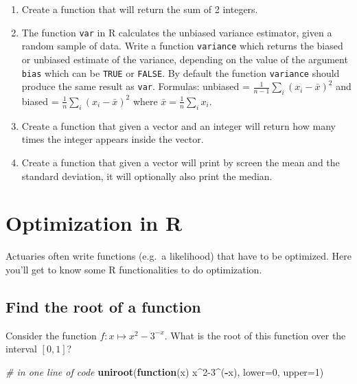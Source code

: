 \documentclass[
]{book}
\newenvironment{Shaded}{\begin{snugshade}}{\end{snugshade}}
\newcommand{\CommentTok}[1]{\textcolor[rgb]{0.56,0.35,0.01}{\textit{#1}}}
\newcommand{\ControlFlowTok}[1]{\textcolor[rgb]{0.13,0.29,0.53}{\textbf{#1}}}
\newcommand{\DataTypeTok}[1]{\textcolor[rgb]{0.13,0.29,0.53}{#1}}
\newcommand{\DecValTok}[1]{\textcolor[rgb]{0.00,0.00,0.81}{#1}}
\newcommand{\KeywordTok}[1]{\textcolor[rgb]{0.13,0.29,0.53}{\textbf{#1}}}
\newcommand{\NormalTok}[1]{#1}
\newcommand{\OperatorTok}[1]{\textcolor[rgb]{0.81,0.36,0.00}{\textbf{#1}}}
\begin{document}
\begin{enumerate}
\def\labelenumi{\arabic{enumi}.}
\item
  Create a function that will return the sum of 2 integers.
\item
  The function \texttt{var} in R calculates the unbiased variance estimator, given
  a random sample of data. Write a function \texttt{variance} which returns the biased
  or unbiased estimate of the variance, depending on the value of the argument
  \texttt{bias} which can be \texttt{TRUE} or \texttt{FALSE}. By default the function \texttt{variance}
  should produce the same result as \texttt{var}.
  Formulas: unbiased = \(\frac{1}{n-1}\sum_i (x_i-\bar{x})^2\) and
  biased = \(\frac{1}{n}\sum_i(x_i-\bar{x})^2\) where \(\bar{x}=\frac{1}{n} \sum_i x_i\).
\item
  Create a function that given a vector and an integer will return how many times the integer appears inside the vector.
\item
  Create a function that given a vector will print by screen the mean and the standard deviation, it will optionally also print the median.
\end{enumerate}

\begin{learncheck}

\end{learncheck}

\hypertarget{optimization}{%
\chapter{Optimization in R}\label{optimization}}

Actuaries often write functions (e.g.~a likelihood) that have to be optimized. Here you'll get to know some R functionalities to do optimization.

\hypertarget{find-the-root-of-a-function}{%
\section{Find the root of a function}\label{find-the-root-of-a-function}}

Consider the function \(f: x \mapsto x^2-3^{-x}\). What is the root of this function over the interval \([0,1]\)?

\begin{Shaded}
\begin{Highlighting}[]
\CommentTok{# in one line of code}
\KeywordTok{uniroot}\NormalTok{(}\ControlFlowTok{function}\NormalTok{(x) x}\OperatorTok{^}\DecValTok{2-3}\OperatorTok{^}\NormalTok{(}\OperatorTok{-}\NormalTok{x), }\DataTypeTok{lower=}\DecValTok{0}\NormalTok{, }\DataTypeTok{upper=}\DecValTok{1}\NormalTok{)}
\end{Highlighting}
\end{Shaded}
\end{document}
